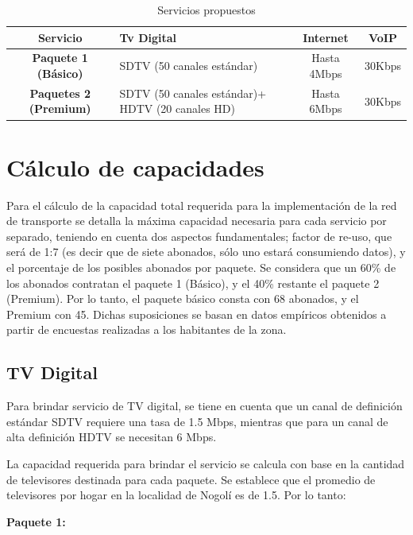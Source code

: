 \documentclass[12pt,a4paper]{book}
\begin{document}
\begin{table}[H]
\centering
\begin{tabular}{|c|>{\centering}m{6cm}|c|c|}
\hline 
\textbf{Servicio} & \textbf{Tv Digital} & \textbf{Internet} & \textbf{VoIP} \\ 
\hline 
\textbf{Paquete 1 (Básico)} & SDTV (50 canales estándar) & Hasta 4Mbps & 30Kbps \\ 
\hline 
\textbf{Paquetes 2 (Premium)} & SDTV (50 canales estándar)+ HDTV (20 canales HD) & Hasta 6Mbps & 30Kbps \\ 
\hline 
\end{tabular}
\caption{Servicios propuestos}
\label{tab_serv_prop_dem}
\end{table}



\section{Cálculo de capacidades}

Para el cálculo de la capacidad total requerida para la implementación de la red de transporte se detalla la máxima capacidad necesaria para cada servicio por separado, teniendo en cuenta dos aspectos fundamentales; factor de re-uso, que será de 1:7 (es decir que de siete abonados, sólo uno estará consumiendo datos), y el porcentaje de los posibles abonados por paquete. 
Se considera que un 60\% de los abonados contratan el paquete 1 (Básico), y el 40\% restante el paquete 2 (Premium). Por lo tanto, el paquete básico consta con 68 abonados, y el Premium con 45. Dichas suposiciones se basan en datos empíricos obtenidos a partir de encuestas realizadas a los habitantes de la zona.



\subsection{TV Digital}

Para brindar servicio de TV digital, se tiene en cuenta que un canal de definición estándar SDTV requiere una tasa de 1.5 Mbps, mientras que para un canal de alta definición HDTV se necesitan 6 Mbps.

La capacidad requerida para brindar el servicio se calcula con base en la cantidad de televisores destinada para cada paquete. Se establece que el promedio de televisores por hogar en la localidad de Nogolí es de 1.5. Por lo tanto:
\medskip

\noindent\textbf{Paquete 1:}
\end{document}
